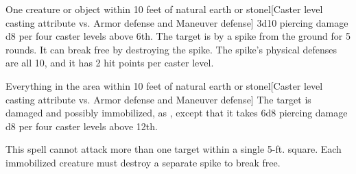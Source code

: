 \begin{spellheader}
    \spellrng{\rngmed}
\end{spellheader}
\begin{spelleffects}
    \begin{spelltarget}{One creature or object within 10 feet of natural earth or stone}l[Caster level \add casting attribute vs. Armor defense and Maneuver defense]
         3d10 piercing damage \add d8 per four caster levels above 6th.
         The target is \immobilized by a spike from the ground for 5 rounds. It can break free by destroying the spike. The spike's physical defenses are all 10, and it has 2 hit points per caster level.
    \end{spelltarget}
\end{spelleffects}

\begin{spellheader}
    \spellrng{\rngmed}
\end{spellheader}
\begin{spelleffects}
    \begin{spelltargets}{Everything in the area within 10 feet of natural earth or stone}l[Caster level \add casting attribute vs. Armor defense and Maneuver defense]
        \spellsuccess The target is damaged and possibly immobilized, as , except that it takes 6d8 piercing damage \add d8 per four caster levels above 12th.
    \end{spelltargets}
\end{spelleffects}
\begin{spellfooter}
    \spellnotes This spell cannot attack more than one target within a single 5-ft. square. Each immobilized creature must destroy a separate spike to break free.
\end{spellfooter}

